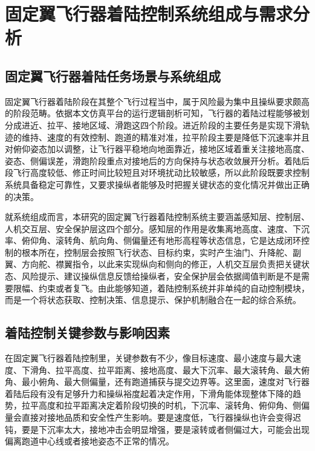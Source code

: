 
\chapter{固定翼飞行器着陆控制系统组成与需求分析}

\section{固定翼飞行器着陆任务场景与系统组成}

固定翼飞行器着陆阶段在其整个飞行过程当中，属于风险最为集中且操纵要求颇高的阶段范畴。依据本文仿真平台的运行逻辑剖析可知，飞行器的着陆过程能够被划分成进近、拉平、接地区域、滑跑这四个阶段。进近阶段的主要任务是实现下滑轨迹的维持、速度的有效控制、跑道的精准对准，拉平阶段主要是降低下沉速率并且对俯仰姿态加以调整，让飞行器平稳地向地面靠近，接地区域着重关注接地高度、姿态、侧偏误差，滑跑阶段重点对接地后的方向保持与状态收敛展开分析。着陆后段飞行高度较低、修正时间比较短且对环境扰动比较敏感，所以此阶段既要求控制系统具备稳定可靠性，又要求操纵者能够及时把握关键状态的变化情况并做出正确的决策。

就系统组成而言，本研究的固定翼飞行器着陆控制系统主要涵盖感知层、控制层、人机交互层、安全保护层这四个部分。感知层的作用是收集离地高度、速度、下沉率、俯仰角、滚转角、航向角、侧偏量还有地形高程等状态信息，它是达成闭环控制的根本所在，控制层会按照飞行状态、目标约束，实时产生油门、升降舵、副翼、方向舵、襟翼指令，以此来实现纵向和侧向的修正，人机交互层负责把关键状态、风险提示、建议操纵信息反馈给操纵者，安全保护层会依据阈值判断是不是需要限幅、约束或者复飞。由此能够知道，着陆控制系统并非单纯的自动控制模块，而是一个将状态获取、控制决策、信息提示、保护机制融合在一起的综合系统。

\section{着陆控制关键参数与影响因素}

在固定翼飞行器着陆控制里，关键参数有不少，像目标速度、最小速度与最大速度、下滑角、拉平高度、拉平距离、接地高度、最大下沉率、最大滚转角、最大俯角、最小俯角、最大侧偏量，还有跑道捕获与提交边界等。这里面，速度对飞行器着陆后段有没有足够升力和操纵裕度起着决定作用，下滑角能体现整体下降的趋势，拉平高度和拉平距离决定着阶段切换的时机，下沉率、滚转角、俯仰角、侧偏量会直接对接地品质和安全性产生影响。要是速度低，飞行器操纵也许会变得迟钝，要是下沉率太大，接地冲击会明显增强，要是滚转或者侧偏过大，可能会出现偏离跑道中心线或者接地姿态不正常的情况。


